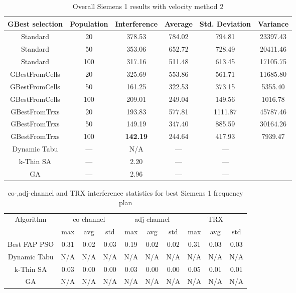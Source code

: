 \begin{table}[H]
\centering
	\begin{tabular}{cccccc}
	\toprule
    GBest selection & Population & Interference & Average & Std. Deviation & Variance \\
    \midrule
    Standard & 20 & 378.53 & 784.02 & 794.81 & 23397.43\\
    Standard & 50 & 353.06 & 652.72 & 728.49 & 20411.46\\
    Standard & 100 & 317.16 & 511.48 & 613.45 & 17105.75\\
    GBestFromCells & 20 & 325.69 & 553.86 & 561.71 & 11685.80\\
    GBestFromCells & 50 & 161.25 & 322.53 & 373.15 & 5355.40\\
    GBestFromCells & 100 & 209.01 & 249.04 & 149.56 & 1016.78\\
    GBestFromTrxs & 20 & 193.83 & 577.81 & 1111.87 & 45787.46\\
    GBestFromTrxs & 50 & 149.19 & 347.40 & 885.59 & 30164.26\\
    GBestFromTrxs & 100 & \textbf{142.19} & 244.64 & 417.93 & 7939.47\\
    \midrule
    Dynamic Tabu & --- & \small{N/A} & --- & --- \\
    k-Thin SA & --- & 2.20 & --- & --- \\
    GA & --- & 2.96 & --- & --- \\
    \bottomrule
	\end{tabular}
\caption{Overall Siemens 1 results with velocity method 2}
\label{tab:siem1m2}
\end{table}
\begin{table}[H]
\centering
	\begin{tabular}{cccccccccc}
	\toprule
    Algorithm & \multicolumn{3}{c}{co-channel} & \multicolumn{3}{c}{adj-channel} & \multicolumn{3}{c}{TRX}\\
              & max & avg & std
              & max & avg & std
              & max & avg & std\\
    \midrule
    Best FAP PSO & 0.31 & 0.02 & 0.03 & 0.19 & 0.02 & 0.02 & 0.31 & 0.03 & 0.03\\ 
    Dynamic Tabu & \scriptsize{N/A} & \scriptsize{N/A} & \scriptsize{N/A} & \scriptsize{N/A} & \scriptsize{N/A} & \scriptsize{N/A} & \scriptsize{N/A} & \scriptsize{N/A} & \scriptsize{N/A}\\
    k-Thin SA & 0.03 & 0.00 & 0.00 & 0.03 & 0.00 & 0.00 & 0.05 & 0.01 & 0.01\\
    GA & \scriptsize{N/A} & \scriptsize{N/A} &  \scriptsize{N/A} &  \scriptsize{N/A} &  \scriptsize{N/A} &  \scriptsize{N/A} &  \scriptsize{N/A} &  \scriptsize{N/A} & \scriptsize{N/A}\\
    \bottomrule
	\end{tabular}
\caption{co-,adj-channel and TRX interference statistics for best Siemens 1 frequency plan}
\label{tab:stats-siem1m1}
\end{table}
